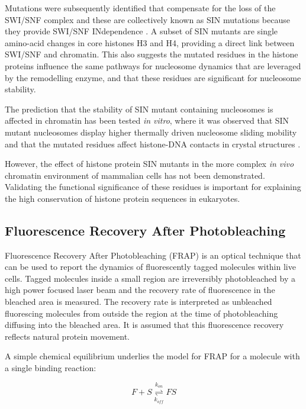     Mutations were subsequently identified that compensate for the
    loss of the SWI/SNF complex and these are collectively known as SIN
    mutations because they provide SWI/SNF INdependence
    \citep{kruger1995amino}.  A subset of SIN mutants are single
    amino-acid changes in core histones H3 and H4, providing a direct
    link between SWI/SNF and chromatin.  This also suggests the
    mutated residues in the histone proteins influence the same
    pathways for nucleosome dynamics that are leveraged
    by the remodelling enzyme, and that
    these residues are significant for nucleosome stability.

    The prediction that the stability of SIN mutant containing
    nucleosomes is affected in chromatin has been tested \textit{in vitro},
    where it was observed that SIN mutant nucleosomes display higher
    thermally driven nucleosome sliding mobility \citep{flaus2004sin}
    and that the mutated residues affect histone-DNA contacts in
    crystal structures \citep{muthurajan2004crystal}.

    However, the effect of histone protein SIN mutants
    in the more complex \textit{in vivo} chromatin environment
    of mammalian cells has not been demonstrated.
    Validating the functional significance of these residues
    is important for explaining the high conservation of
    histone protein sequences in eukaryotes.

  \subsection{Fluorescence Recovery After Photobleaching}

    Fluorescence Recovery After Photobleaching (FRAP) is an optical technique
    that can be used to report the dynamics of fluorescently
    tagged molecules within live cells.
    Tagged molecules inside a small region are irreversibly photobleached by
    a high power focused laser beam and the recovery rate of fluorescence
    in the bleached area is measured. The recovery rate is interpreted
    as unbleached fluorescing molecules from outside the region
    at the time of photobleaching diffusing into the bleached area.
    It is assumed that this fluorescence recovery
    reflects natural protein movement.

    A simple chemical equilibrium underlies the model for FRAP for a
    molecule with a single binding reaction:

    \begin{displaymath}
      F + S \overset{k_{on}}{\underset{k_{off}}{\rightleftharpoons}} FS
    \end{displaymath}

